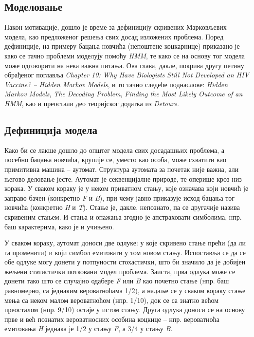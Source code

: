 \documentclass[12pt,oneside]{memoir}
\begin{document}
\begin{CJK}{UTF8}{ipxm}
\chapter{Моделовање}
Након мотивације, дошло је време за дефиницију скривених Марковљевих модела, као предложеног решења свих досад изложених проблема. Поред дефиниције, на примеру бацања новчића (непоштене коцкарнице) приказано је како се тачно проблеми моделују помоћу \textit{HMM}, те како се на основу тог модела може одговорити на нека важна питања. Ова глава, дакле, покрива другу петину обрађеног поглавља \textit{Chapter 10: Why Have Biologists Still Not Developed an HIV Vaccine? -- Hidden Markov Models}, и то тачно следеће поднаслове: \textit{Hidden Markov Models}, \textit{The Decoding Problem}, \textit{Finding the Most Likely Outcome of an HMM}, као и преостали део теоријског додатка из \textit{Detours}.

\section{Дефиниција модела}
Како би се лакше дошло до општег модела свих досадашњих проблема, а посебно бацања новчића, крупије се, уместо као особа, може схватити као примитивна машина -- аутомат. Структура аутомата за почетак није важна, али његово деловање јесте. Аутомат је секвенцијалне природе, те оперише кроз низ корака. У сваком кораку је у неком приватном стању, које означава који новчић је заправо бачен (конкретно \textit{F} и \textit{B}), при чему јавно приказује исход бацања тог новчића (конкретно \textit{H} и \textit{T}). Стање је, дакле, непознато, па се другачије назива скривеним стањем. И стања и опажања згодно је апстраховати симболима, нпр. баш карактерима, како је и учињено.

У сваком кораку, аутомат доноси две одлуке: у које скривено стање прећи (да ли га променити) и који симбол емитовати у том новом стању. Испоставља се да се обе одлуке могу донети у потпуности стохастички, што би значило да је добијен жељени статистички потковани модел проблема. Заиста, прва одлука може се донети тако што се случајно одабере \textit{F} или \textit{B} као почетно стање (нпр. баш равномерно, са једнаким вероватноћама 1/2), а надаље се у сваком кораку стање мења са неком малом вероватноћом (нпр. 1/10), док се са знатно већом преосталом (нпр. 9/10) остаје у истом стању. Друга одлука доноси се на основу прве и већ познатих вероватносних особина коцкице -- нпр. вероватноћа емитовања \textit{H} једнака је 1/2 у стању \textit{F}, а 3/4 у стању \textit{B}.


\end{CJK}
\end{document}
